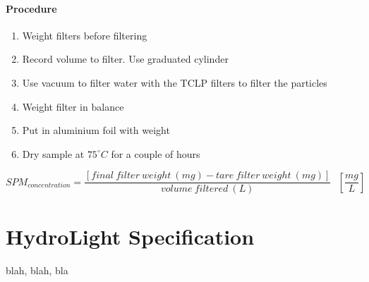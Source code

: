 \begin{appendices}
\subsubsection{{\color{red} Procedure}}
\begin{enumerate}
  \item Weight filters before filtering
  \item Record volume to filter. Use graduated cylinder
  \item Use vacuum to filter water with the TCLP filters to filter the particles
  \item Weight filter in balance
  \item Put in aluminium foil with weight
  \item Dry sample at $75^\circ C$ for a couple of hours
\end{enumerate}


\begin{equation}
SPM_{\displaystyle concentration} = \frac{[final~filter~weight~(mg) - tare~filter~weight~(mg)]}{volume~filtered~(L)}~~~\left[\frac{mg}{L}\right]
\end{equation}



\chapter{HydroLight Specification}

blah, blah, bla

\end{appendices}